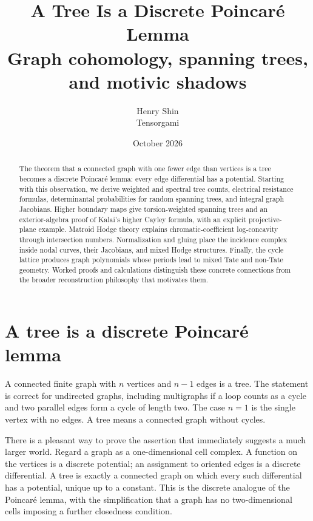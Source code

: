 \documentclass[11pt]{article}
\title{\textbf{A Tree Is a Discrete Poincar\'e Lemma}\\[6pt]\large Graph cohomology, spanning trees, and motivic shadows}
\author{Henry Shin\\\small Tensorgami}
\date{\small October 2026}
\theoremstyle{definition}
\theoremstyle{remark}
\begin{document}
\maketitle\thispagestyle{empty}
\begin{abstract}
The theorem that a connected graph with one fewer edge than vertices is a tree becomes a discrete Poincar\'e lemma: every edge differential has a potential. Starting with this observation, we derive weighted and spectral tree counts, electrical resistance formulas, determinantal probabilities for random spanning trees, and integral graph Jacobians. Higher boundary maps give torsion-weighted spanning trees and an exterior-algebra proof of Kalai's higher Cayley formula, with an explicit projective-plane example. Matroid Hodge theory explains chromatic-coefficient log-concavity through intersection numbers. Normalization and gluing place the incidence complex inside nodal curves, their Jacobians, and mixed Hodge structures. Finally, the cycle lattice produces graph polynomials whose periods lead to mixed Tate and non-Tate geometry. Worked proofs and calculations distinguish these concrete connections from the broader reconstruction philosophy that motivates them.
\end{abstract}
\clearpage
\begingroup\setlength{\parskip}{0pt}\fontsize{10}{12}\selectfont\tableofcontents\endgroup
\clearpage


\section{A tree is a discrete Poincar\'e lemma}
\label{sec:tree}

A connected finite graph with \(n\) vertices and \(n-1\) edges is a tree. The statement is correct for undirected graphs, including multigraphs if a loop counts as a cycle and two parallel edges form a cycle of length two. The case \(n=1\) is the single vertex with no edges. A tree means a connected graph without cycles.

There is a pleasant way to prove the assertion that immediately suggests a much larger world. Regard a graph as a one-dimensional cell complex. A function on the vertices is a discrete potential; an assignment to oriented edges is a discrete differential. A tree is exactly a connected graph on which every such differential has a potential, unique up to a constant. This is the discrete analogue of the Poincar\'e lemma, with the simplification that a graph has no two-dimensional cells imposing a further closedness condition.
\end{document}
